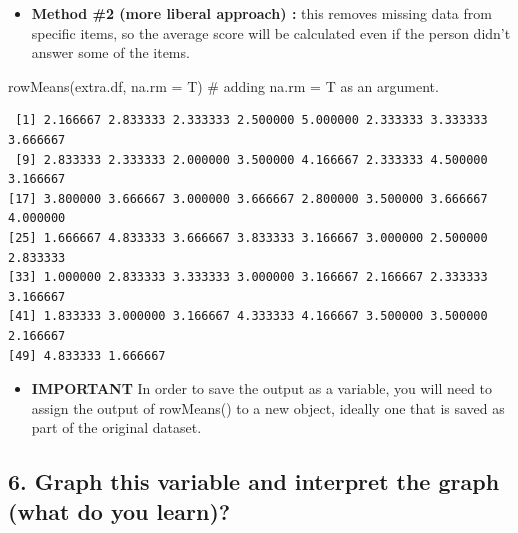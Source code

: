 \documentclass[
  letterpaper,
  DIV=11,
  numbers=noendperiod,
  oneside]{scrreprt}
\newenvironment{Shaded}{\begin{snugshade}}{\end{snugshade}}
\newcommand{\AttributeTok}[1]{\textcolor[rgb]{0.40,0.45,0.13}{#1}}
\newcommand{\CommentTok}[1]{\textcolor[rgb]{0.37,0.37,0.37}{#1}}
\newcommand{\FunctionTok}[1]{\textcolor[rgb]{0.28,0.35,0.67}{#1}}
\newcommand{\NormalTok}[1]{\textcolor[rgb]{0.00,0.23,0.31}{#1}}
\newcommand{\OtherTok}[1]{\textcolor[rgb]{0.00,0.23,0.31}{#1}}
\newcommand{\SpecialCharTok}[1]{\textcolor[rgb]{0.37,0.37,0.37}{#1}}
\providecommand{\tightlist}{%
  \setlength{\itemsep}{0pt}\setlength{\parskip}{0pt}}\usepackage{longtable,booktabs,array}
\begin{document}
\begin{itemize}
\tightlist
\item
  \textbf{Method \#2 (more liberal approach) :} this removes missing
  data from specific items, so the average score will be calculated even
  if the person didn't answer some of the items.~
\end{itemize}

\begin{Shaded}
\begin{Highlighting}[]
\FunctionTok{rowMeans}\NormalTok{(extra.df, }\AttributeTok{na.rm =}\NormalTok{ T) }\CommentTok{\#     adding na.rm = T as an argument. }
\end{Highlighting}
\end{Shaded}

\begin{verbatim}
 [1] 2.166667 2.833333 2.333333 2.500000 5.000000 2.333333 3.333333 3.666667
 [9] 2.833333 2.333333 2.000000 3.500000 4.166667 2.333333 4.500000 3.166667
[17] 3.800000 3.666667 3.000000 3.666667 2.800000 3.500000 3.666667 4.000000
[25] 1.666667 4.833333 3.666667 3.833333 3.166667 3.000000 2.500000 2.833333
[33] 1.000000 2.833333 3.333333 3.000000 3.166667 2.166667 2.333333 3.166667
[41] 1.833333 3.000000 3.166667 4.333333 4.166667 3.500000 3.500000 2.166667
[49] 4.833333 1.666667
\end{verbatim}

\begin{itemize}
\tightlist
\item
  \textbf{IMPORTANT} In order to save the output as a variable, you will
  need to assign the output of rowMeans() to a new object, ideally one
  that is saved as part of the original dataset.
\end{itemize}

\begin{Shaded}
\end{Shaded}

\subsection{6. Graph this variable and interpret the graph (what do you
learn)?}\label{graph-this-variable-and-interpret-the-graph-what-do-you-learn}
\end{document}
